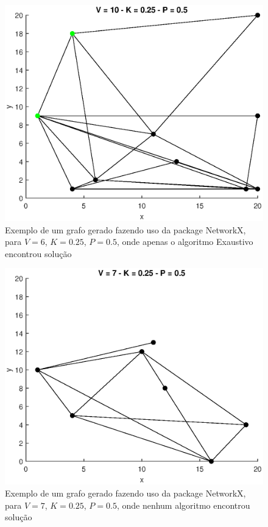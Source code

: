 \documentclass{revdetua}
\begin{document}
\begin{figure}[h!]
\centering
\includegraphics[scale = 0.5]{Figs/example_graph_Exaust.eps}
\caption{Exemplo de um grafo gerado fazendo uso da package NetworkX, para  $V = 6$, $K = 0.25$, $P = 0.5$, onde apenas o algoritmo Exaustivo encontrou solução}
\label{graf_example1}
\end{figure}

\begin{figure}[h!]
\centering
\includegraphics[scale = 0.5]{Figs/example_graph_None.eps}
\caption{Exemplo de um grafo gerado fazendo uso da package NetworkX, para  $V = 7$, $K = 0.25$, $P = 0.5$, onde nenhum algoritmo encontrou solução}
\label{graf_example2}
\end{figure}
\end{document}
